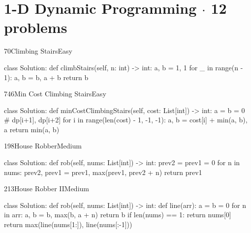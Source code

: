 \section{1-D Dynamic Programming \texorpdfstring{{\normalsize\color{muted}$\cdot$ 12 problems}}{- 12 problems}}

\begin{problem}{70}{Climbing Stairs}{Easy}
\begin{code}
class Solution:
    def climbStairs(self, n: int) -> int:
        a, b = 1, 1
        for _ in range(n - 1):
            a, b = b, a + b
        return b
\end{code}
\end{problem}

\begin{problem}{746}{Min Cost Climbing Stairs}{Easy}
\begin{code}
class Solution:
    def minCostClimbingStairs(self, cost: List[int]) -> int:
        a = b = 0                       # dp[i+1], dp[i+2]
        for i in range(len(cost) - 1, -1, -1):
            a, b = cost[i] + min(a, b), a
        return min(a, b)
\end{code}
\end{problem}

\begin{problem}{198}{House Robber}{Medium}
\begin{code}
class Solution:
    def rob(self, nums: List[int]) -> int:
        prev2 = prev1 = 0
        for n in nums:
            prev2, prev1 = prev1, max(prev1, prev2 + n)
        return prev1
\end{code}
\end{problem}

\begin{problem}{213}{House Robber II}{Medium}
\begin{code}
class Solution:
    def rob(self, nums: List[int]) -> int:
        def line(arr):
            a = b = 0
            for n in arr:
                a, b = b, max(b, a + n)
            return b
        if len(nums) == 1:
            return nums[0]
        return max(line(nums[1:]), line(nums[:-1]))
\end{code}
\end{problem}

